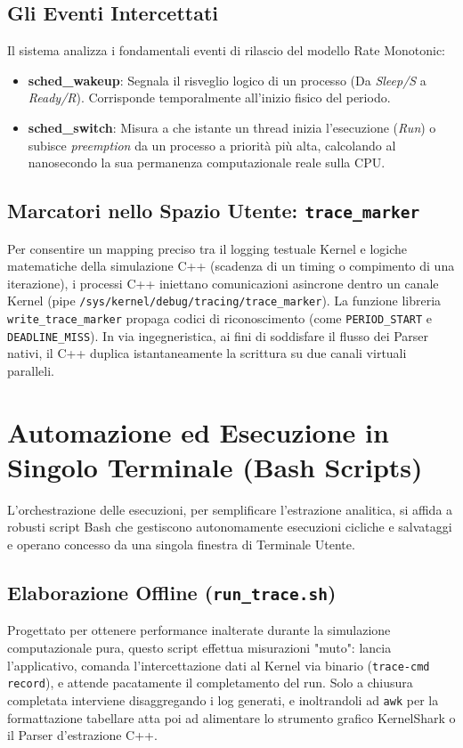 \documentclass[a4paper,12pt]{report}
\begin{document}
\section{Gli Eventi Intercettati}
Il sistema analizza i fondamentali eventi di rilascio del modello Rate Monotonic:
\begin{itemize}
    \item \textbf{sched\_wakeup}: Segnala il risveglio logico di un processo (Da \textit{Sleep/S} a \textit{Ready/R}). Corrisponde temporalmente all'inizio fisico del periodo.
    \item \textbf{sched\_switch}: Misura a che istante un thread inizia l'esecuzione (\textit{Run}) o subisce \textit{preemption} da un processo a priorità più alta, calcolando al nanosecondo la sua permanenza computazionale reale sulla CPU.
\end{itemize}

\section{Marcatori nello Spazio Utente: \texttt{trace\_marker}}
Per consentire un mapping preciso tra il logging testuale Kernel e logiche matematiche della simulazione C++ (scadenza di un timing o compimento di una iterazione), i processi C++ iniettano comunicazioni asincrone dentro un canale Kernel (pipe \verb!/sys/kernel/debug/tracing/trace_marker!).  La funzione libreria \verb!write_trace_marker! propaga codici di riconoscimento (come \verb!PERIOD_START! e \verb!DEADLINE_MISS!). In via ingegneristica, ai fini di soddisfare il flusso dei Parser nativi, il C++ duplica istantaneamente la scrittura su due canali virtuali paralleli.

\chapter{Automazione ed Esecuzione in Singolo Terminale (Bash Scripts)}
L'orchestrazione delle esecuzioni, per semplificare l'estrazione analitica, si affida a robusti script Bash che gestiscono autonomamente esecuzioni cicliche e salvataggi e operano concesso da una singola finestra di Terminale Utente.

\section{Elaborazione Offline (\texttt{run\_trace.sh})}
Progettato per ottenere performance inalterate durante la simulazione computazionale pura, questo script effettua misurazioni "muto": lancia l'applicativo, comanda l'intercettazione dati al Kernel via binario (\verb!trace-cmd record!), e attende pacatamente il completamento del run. 
Solo a chiusura completata interviene disaggregando i log generati, e inoltrandoli ad \verb!awk! per la formattazione tabellare atta poi ad alimentare lo strumento grafico KernelShark o il Parser d'estrazione C++.
\end{document}
